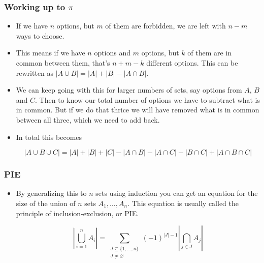\documentclass{beamer}
\newcommand\abs[1]{\left|#1\right|}
\begin{document}
\begin{frame}[plain]
\frametitle{Working up to $\pi$}

\begin{itemize}

\item If we have $n$ options, but $m$ of them are forbidden, we are left with $n - m$ ways to choose.

\item This means if we have $n$ options and $m$ options, but $k$ of them are in common between them, that's $n + m - k$ different options. This can be rewritten as $\abs{A \cup B} = \abs{A} + \abs{B} - \abs{A \cap B}$.

\item We can keep going with this for larger numbers of sets, say options from $A$, $B$ and $C$. Then to know our total number of options we have to subtract what is in common. But if we do that thrice we will have removed what is in common between all three, which we need to add back.

\item In total this becomes
\begin{small}
\[\abs{A \cup B \cup C} = \abs{A} + \abs{B} + \abs{C} - \abs{A \cap B} - \abs{A \cap C} - \abs{B \cap C} + \abs{A \cap B \cap C}\]
\end{small}

\end{itemize}

\end{frame}

\begin{frame}[plain]
\frametitle{PIE}

\begin{itemize}

\item By generalizing this to $n$ sets using induction you can get an equation for the size of the union of $n$ sets $A_1, \dots, A_n$. This equation is usually called the principle of inclusion-exclusion, or PIE.

\[\abs{\bigcup_{i = 1}^n A_i} = \sum_{\substack{J \subseteq \{1,\dots,n\} \\ J \neq \varnothing}} (-1)^{\abs{J} - 1} \abs{\bigcap_{j \in J} A_j}\]

\end{itemize}

\end{frame}
\end{document}
